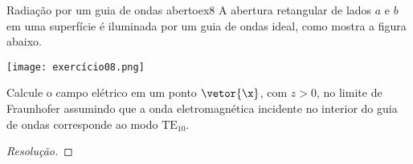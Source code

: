 \begin{exercício}{Radiação por um guia de ondas aberto}{ex8}
    A abertura retangular de lados \(a\) e \(b\) em uma superfície é iluminada por um guia de ondas ideal, como mostra a figura abaixo. 
    \begin{center}
        \texttt{[image: exercício08.png]}
    \end{center}
    Calcule o campo elétrico em um ponto \(\vetor{\x}\), com \(z > 0\), no limite de Fraunhofer assumindo que a onda eletromagnética incidente no interior do guia de ondas corresponde ao modo \(\mathrm{TE}_{10}.\)
\end{exercício}
\begin{proof}[Resolução]
    
\end{proof}

